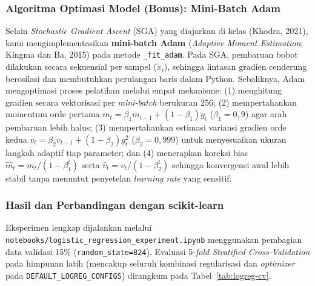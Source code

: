 \subsubsection{Algoritma Optimasi Model (Bonus): Mini-Batch Adam}

Selain \textit{Stochastic Gradient Ascent} (SGA) yang diajarkan di kelas (Khodra, 2021),
kami mengimplementasikan \textbf{mini-batch Adam} (\textit{Adaptive Moment Estimation};
Kingma dan Ba, 2015) pada metode \texttt{\_fit\_adam}. Pada SGA, pembaruan bobot dilakukan
secara sekuensial per sampel ($\tilde{x}_i$), sehingga lintasan gradien cenderung berosilasi
dan membutuhkan perulangan baris dalam Python. Sebaliknya, Adam mengoptimasi proses
pelatihan melalui empat mekanisme:
(1) menghitung gradien secara vektorisasi per \textit{mini-batch} berukuran 256;
(2) mempertahankan momentum orde pertama $m_t = \beta_1 m_{t-1} + (1 - \beta_1) g_t$
($\beta_1 = 0{,}9$) agar arah pembaruan lebih halus; (3) mempertahankan estimasi
variansi gradien orde kedua $v_t = \beta_2 v_{t-1} + (1 - \beta_2) g_t^2$
($\beta_2 = 0{,}999$) untuk menyesuaikan ukuran langkah adaptif tiap parameter; dan
(4) menerapkan koreksi bias $\hat{m}_t = m_t / (1 - \beta_1^t)$ serta
$\hat{v}_t = v_t / (1 - \beta_2^t)$ sehingga konvergensi awal lebih stabil tanpa
menuntut penyetelan \textit{learning rate} yang sensitif.

\subsubsection{Hasil dan Perbandingan dengan scikit-learn}

Eksperimen lengkap dijalankan melalui
\texttt{notebooks/logistic\_regression\_experiment.ipynb} menggunakan pembagian
data validasi 15\% (\texttt{random\_state=824}). Evaluasi 5-\textit{fold
Stratified Cross-Validation} pada himpunan latih (mencakup seluruh kombinasi
regularisasi dan \textit{optimizer} pada \texttt{DEFAULT\_LOGREG\_CONFIGS})
dirangkum pada Tabel~\ref{tab:logreg-cv}.

